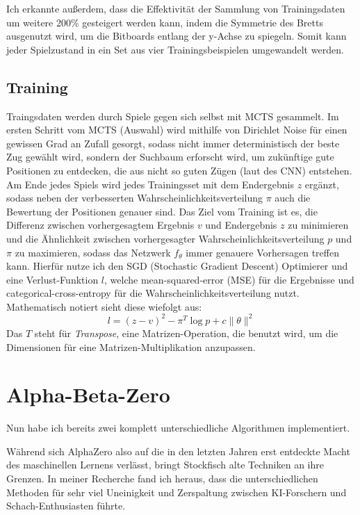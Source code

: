 \documentclass[
  manuscript=article,  %
  layout=publish,  %
  year=2023,
  volume=1,
]{extra/joas}
\begin{document}
Ich erkannte außerdem, dass die Effektivität der Sammlung von Trainingsdaten um weitere 200\% gesteigert werden kann, indem die Symmetrie des Bretts ausgenutzt wird, um die Bitboards entlang der y-Achse zu spiegeln. Somit kann jeder Spielzustand in ein Set aus vier Trainingsbeispielen umgewandelt werden.


\subsection{Training}
Traingsdaten werden durch Spiele gegen sich selbst mit MCTS gesammelt. Im ersten Schritt vom MCTS (Auswahl) wird mithilfe von Dirichlet Noise für einen gewissen Grad an Zufall gesorgt, sodass nicht immer deterministisch der beste Zug gewählt wird, sondern der Suchbaum erforscht wird, um zukünftige gute Positionen zu entdecken, die aus nicht so guten Zügen (laut des CNN) entstehen. 
Am Ende jedes Spiels wird jedes Trainingsset mit dem Endergebnis $z$ ergänzt, sodass neben der verbesserten Wahrscheinlichkeitsverteilung $\pi$ auch die Bewertung der Positionen genauer sind. Das Ziel vom Training ist es, die Differenz zwischen vorhergesagtem Ergebnis $v$ und Endergebnis $z$ zu minimieren und die Ähnlichkeit zwischen vorhergesagter Wahrscheinlichkeitsverteilung $p$ und $\pi$ zu maximieren, sodass das Netzwerk $f_\theta$ immer genauere Vorhersagen treffen kann.
Hierfür nutze ich den SGD (Stochastic Gradient Descent) Optimierer \cite{sgd} und eine Verlust-Funktion $l$, welche mean-squared-error (MSE) für die Ergebnisse und categorical-cross-entropy \cite{crossentropy} für die Wahrscheinlichkeitsverteilung nutzt. Mathematisch notiert sieht diese wiefolgt aus:
\[
l = (z - v)^2 - \pi^T \log p + c\lVert \theta \rVert^2
\]
Das $T$ steht für \textit{Transpose}, eine Matrizen-Operation, die benutzt wird, um die Dimensionen für eine Matrizen-Multiplikation anzupassen.

\section{Alpha-Beta-Zero}
Nun habe ich bereits zwei komplett unterschiedliche Algorithmen implementiert.

Während sich AlphaZero also auf die in den letzten Jahren erst entdeckte Macht des maschinellen Lernens verlässt, bringt Stockfisch alte Techniken an ihre Grenzen. In meiner Recherche fand ich heraus, dass die unterschiedlichen Methoden für sehr viel Uneinigkeit und Zerspaltung zwischen KI-Forschern und Schach-Enthusiasten führte.
\end{document}
